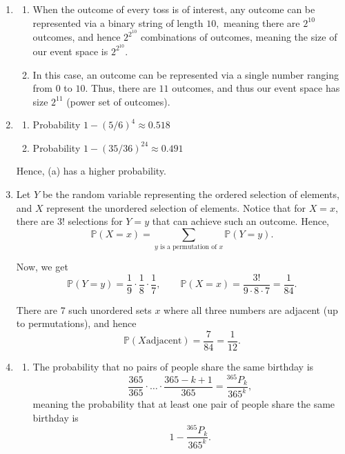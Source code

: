 \documentclass[12pt]{article}
\begin{document}
\begin{enumerate}
  \item
    \begin{enumerate}
      \item When the outcome of every toss is of interest, any
        outcome can be represented via a binary string of length
        $10,$ meaning there are $2^{10}$ outcomes, and hence
        $2^{2^{10}}$ combinations of outcomes, meaning the size of
        our event space is $2^{2^{10}}.$

      \item In this case, an outcome can be represented via a single
        number ranging from $0$ to $10.$ Thus, there are $11$
        outcomes, and thus our event space has size $2^{11}$ (power
        set of outcomes).
    \end{enumerate}

  \item
    \begin{enumerate}
      \item Probability $1 - (5/6)^4 \approx 0.518$
      \item Probability $1 - (35/36)^{24} \approx 0.491$
    \end{enumerate}

    Hence, (a) has a higher probability.

  \item Let $Y$ be the random variable representing the ordered
    selection of elements, and $X$ represent the unordered selection
    of elements. Notice that for $X = x,$ there are $3!$ selections
    for $Y = y$ that can achieve such an outcome. Hence, $$\mathbb
    P(X = x) = \sum_{y \text{ is a permutation of } x}\mathbb P(Y=  y).$$

    Now, we get $$
    \mathbb P(Y = y) = \frac{1}{9} \cdot \frac{1}{8} \cdot
    \frac{1}{7}, \qquad \mathbb P(X = x) = \dfrac{3!}{9 \cdot 8 \cdot
    7} = \dfrac{1}{84}.
    $$

    There are 7 such unordered sets $x$ where all three numbers are
    adjacent (up to permutations), and hence $$\mathbb P(X \text{
    adjacent}) = \dfrac{7}{84} = \frac{1}{12}.$$

  \item
    \begin{enumerate}
      \item The probability that no pairs of people share the same birthday is
        $$
        \dfrac{365}{365} \cdot \ldots \cdot \dfrac{365 -k + 1}{365} =
        \dfrac{^{365}P_k}{365^{k}},
        $$
        meaning the probability that at least one pair of people
        share the same birthday is
        $$
        1- \dfrac{^{365}P_k}{365^{k}}.
        $$


\end{enumerate}
\end{enumerate}
\end{document}
